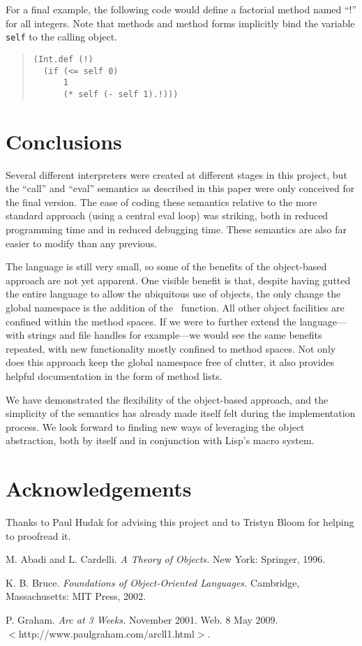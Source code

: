 \documentclass[twocolumn]{article}
\begin{document}
For a final example, the following code would define a factorial
method named ``!'' for all integers. Note that methods and method
forms implicitly bind the variable \texttt{self} to the calling
object.
\begin{quote}
\begin{verbatim}
(Int.def (!)
  (if (<= self 0)
      1
      (* self (- self 1).!)))
\end{verbatim}
\end{quote}

\section*{Conclusions}
Several different interpreters were created at different stages in
this project, but the ``call'' and ``eval'' semantics as described in
this paper were only conceived for the final version. The ease of
coding these semantics relative to the more standard approach (using a
central eval loop) was striking, both in reduced programming time and
in reduced debugging time. These semantics are also far easier to
modify than any previous.

The language is still very small, so some of the benefits of the
object-based approach are not yet apparent. One visible benefit is
that, despite having gutted the entire language to allow the
ubiquitous use of objects, the only change the global namespace is the
addition of the \msg\ function. All other object facilities are
confined within the method spaces. If we were to further extend the
language---with strings and file handles for example---we would see
the same benefits repeated, with new functionality mostly confined to
method spaces. Not only does this approach keep the global namespace
free of clutter, it also provides helpful documentation in the form of
method lists.

We have demonstrated the flexibility of the object-based approach, and
the simplicity of the semantics has already made itself felt during
the implementation process. We look forward to finding new ways of
leveraging the object abstraction, both by itself and in conjunction
with Lisp's macro system.

\section*{Acknowledgements}
Thanks to Paul Hudak for advising this project and to Tristyn Bloom
for helping to proofread it.

\begin{thebibliography}{9}
 M. Abadi and L. Cardelli. \textit{A Theory of Objects.} New
  York: Springer, 1996.

 K. B. Bruce. \textit{Foundations of Object-Oriented
    Languages.} Cambridge, Massachusetts: MIT Press, 2002.

 P. Graham. \textit{Arc at 3 Weeks.} November
  2001. Web. 8 May 2009.\\ $<$http://www.paulgraham.com/arcll1.html$>$.
\end{thebibliography}
\end{document}
